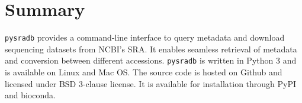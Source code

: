 \documentclass[9pt,a4paper]{extarticle}
\begin{document}
\begin{comment}

\section*{Discussion} %
This section is only required if the paper includes novel data or analyses, and 
should be written in the same style as a traditional discussion section. Please 
include a brief discussion of allowances made (if any) for controlling bias or unwanted sources of variability, and the limitations of any novel datasets.


\section*{Conclusions} %
This section is only required if the paper includes novel data or analyses, and should be written as a traditional conclusion.
\end{comment}

\section*{Summary} %
\texttt{pysradb} provides a command-line interface to query metadata and download
sequencing datasets from NCBI's SRA. It enables seamless retrieval of metadata
and conversion between different accessions. \texttt{pysradb} is written in Python 3
and is available on Linux and Mac OS. The source code is hosted on Github and licensed
under BSD 3-clause license. It is available for installation through PyPI and bioconda.


\begin{comment}


\section*{Data availability} %
Please add details of where any datasets that are mentioned in the paper, and that have not have not previously been formally published, can be found.  If previously published datasets are mentioned, these should be cited in the references, as per usual scholarly conventions.
\end{comment}
\end{document}

